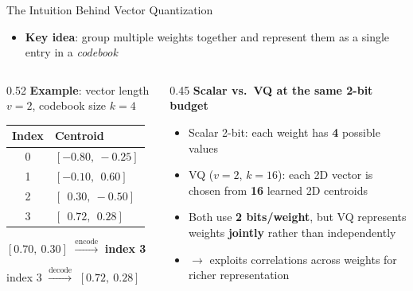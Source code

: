 \begin{frame}{The Intuition Behind Vector Quantization}
  \begin{itemize}
    \item \textbf{Key idea}: group multiple weights together and represent them as a single entry in a \emph{codebook}
  \end{itemize}
  \vspace{0.3em}
  \begin{columns}[T]
    \begin{column}{0.52\textwidth}
      \textbf{Example}: vector length $v=2$, codebook size $k=4$

      \vspace{0.4em}
      \begin{tabular}{cl}
        \toprule
        Index & Centroid \\
        \midrule
        0 & $[-0.80,\ -0.25]$ \\
        1 & $[-0.10,\ \ 0.60]$ \\
        2 & $[\ \ 0.30,\ -0.50]$ \\
        \rowcolor{mycolor!15}
        3 & $[\ \ 0.72,\ \ 0.28]$ \\
        \bottomrule
      \end{tabular}

      \vspace{0.4em}
      $[0.70,\ 0.30]$ $\xrightarrow{\text{encode}}$ \textbf{index 3}

      index $3$ $\xrightarrow{\text{decode}}$ $[0.72,\ 0.28]$
    \end{column}
    \begin{column}{0.45\textwidth}
      \textbf{Scalar vs.\ VQ at the same 2-bit budget}

      \vspace{0.4em}
      \begin{itemize}
        \item Scalar 2-bit: each weight has \textbf{4} possible values
        \item VQ ($v=2$, $k=16$): each 2D vector is chosen from \textbf{16} learned 2D centroids
        \item Both use \textbf{2 bits/weight}, but VQ represents weights \textbf{jointly} rather than independently
        \item $\rightarrow$ exploits correlations across weights for richer representation
      \end{itemize}
    \end{column}
  \end{columns}
\end{frame}

